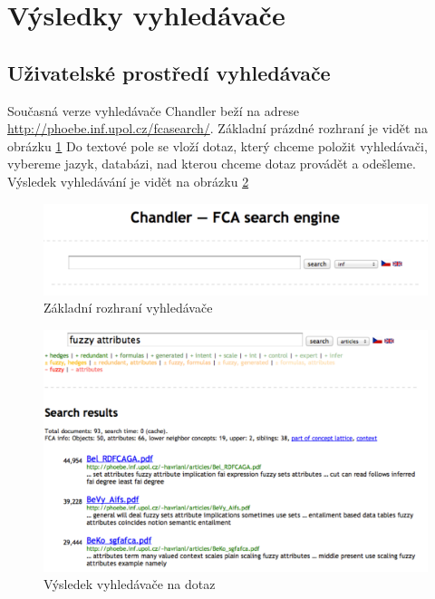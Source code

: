 \documentclass[12pt]{article}
\newcommand{\name}{Chandler}
\newcommand{\nameurl}{\url{http://phoebe.inf.upol.cz/fcasearch/}}
\newcommand{\ssection}[1]{\subsection{#1}}
\newcommand{\addsp}[1]{\left<#1\right>}
\begin{document}

\newpage
\section{Výsledky vyhledávače}

\ssection{Uživatelské prostředí vyhledávače}
Současná verze vyhledávače \name{} beží na adrese \nameurl. Základní prázdné rozhraní je vidět na obrázku \ref{fig.gui.empty} Do textové pole se vloží dotaz, který chceme položit vyhledávači, vybereme jazyk, databázi, nad kterou chceme dotaz provádět a odešleme. Výsledek vyhledávání je vidět na obrázku \ref{fig.gui.result1}

\begin{figure}
  \centering
  \includegraphics[width=14cm]{obrazky/gui-zakladni.pdf}
  \caption{Základní rozhraní vyhledávače}
  \label{fig.gui.empty}
\end{figure}

\begin{figure}
  \centering
  \includegraphics[width=14cm]{obrazky/gui-result1.pdf}
  \caption{Výsledek vyhledávače na dotaz }
  \label{fig.gui.result1}
\end{figure}
\end{document}
